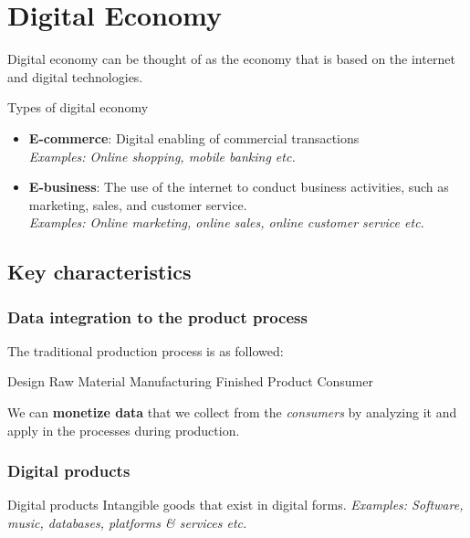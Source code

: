 \documentclass{article}
\begin{document}
\section{Digital Economy}

Digital economy can be thought of as the economy that is based on the internet and digital technologies.

\begin{definition}
    {Types of digital economy}
    \begin{itemize}
        \item \textbf{E-commerce}: Digital enabling of commercial transactions
        \\      \textit{Examples: Online shopping, mobile banking etc.}
        \item \textbf{E-business}: The use of the internet to conduct business activities, such as marketing, sales, and customer service.
        \\      \textit{Examples: Online marketing, online sales, online customer service etc.}
    \end{itemize}
\end{definition}

\subsection{Key characteristics}

\subsubsection{Data integration to the product process}

The traditional production process is as followed:

Design\quad\rightarrowfill\quad
Raw Material\quad\rightarrowfill\quad
Manufacturing\quad\rightarrowfill\quad
Finished Product\quad\rightarrowfill\quad
Consumer

We can \textbf{monetize data} that we collect from the \textit{consumers} by analyzing it and apply in the processes during production.

\subsubsection{Digital products}

\begin{definition}
    {Digital products}
    Intangible goods that exist in digital forms. \textit{Examples: Software, music, databases, platforms \& services etc.}
\end{definition}
\end{document}
